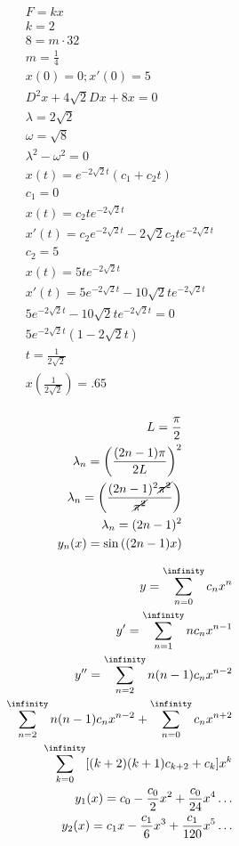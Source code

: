 \documentclass[12pt]{article}
\begin{document}
\begin{equation}
  \begin{split}
    F=kx\\
    k=2\\
    8=m\cdot32\\
    m=\frac{1}{4}\\
    x(0)=0; x'(0)=5\\
    D^2x+4\sqrt{2}Dx+8x=0\\
    \lambda=2\sqrt{2}\\
    \omega=\sqrt{8}\\
    \lambda^2-\omega^2=0\\
    x(t)=e^{-2\sqrt{2}t}(c_1+c_2t)\\
    c_1=0\\
    x(t)=c_2te^{-2\sqrt{2}t}\\
    x'(t)=c_2e^{-2\sqrt{2}t}-2\sqrt{2}c_2te^{-2\sqrt{2}t}\\
    c_2=5\\
    x(t)=5te^{-2\sqrt{2}t}\\
    x'(t)=5e^{-2\sqrt{2}t}-10\sqrt{2}te^{-2\sqrt{2}t}\\
    5e^{-2\sqrt{2}t}-10\sqrt{2}te^{-2\sqrt{2}t}=0\\
    5e^{-2\sqrt{2}t}(1-2\sqrt{2}t)\\
    t=\frac{1}{2\sqrt{2}}\\
    x(\frac{1}{2\sqrt{2}})=.65\\
  \end{split}
  \label{8}
\end{equation}


\hline
\begin{equation}
  \begin{split}
    L=\frac{\pi}{2}\\
    \lambda_n=\left( \frac{(2n-1)\pi}{2L} \right)^2\\
    \lambda_n=\left( \frac{(2n-1)^2\cancel{\pi^2}}{\cancel{\pi^2}} \right)\\
    \lambda_n=(2n-1)^2\\
    y_n(x)=\sin\left( (2n-1)x \right)\\
  \end{split}
  \label{9}
\end{equation}

\hline
\begin{equation}
  \begin{split}
    y=\sum_{n=0}^{\infinity} c_nx^n\\
    y'=\sum_{n=1}^{\infinity} nc_nx^{n-1}\\
    y''=\sum_{n=2}^{\infinity} n(n-1)c_nx^{n-2}\\
    \sum_{n=2}^{\infinity} n(n-1)c_nx^{n-2}+\sum_{n=0}^{\infinity} c_nx^{n+2}\\
    \sum_{k=0}^{\infinity} [(k+2)(k+1)c_{k+2}+c_k]x^{k}\\
    y_1(x)=c_0-\frac{c_0}{2}x^2+\frac{c_0}{24}x^4\dots\\
    y_2(x)=c_1x-\frac{c_1}{6}x^3+\frac{c_1}{120}x^5\dots\\
  \end{split}
  \label{10}
\end{equation}
\hline
\end{document}
